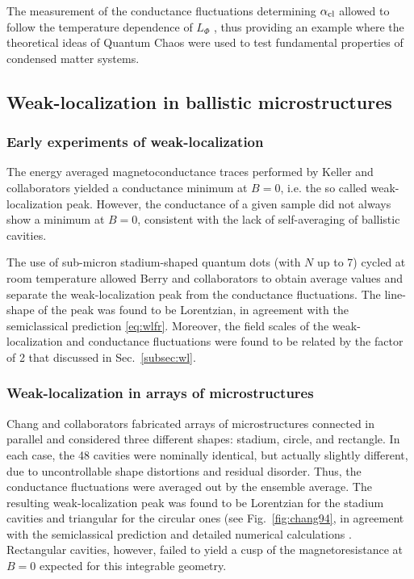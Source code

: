 \documentclass[a4paper,10pt]{article}
\newcommand{\nin}{\noindent}
\newcommand{\alc}{\alpha_{\rm cl}}
\begin{document}
\nin The measurement of the conductance fluctuations determining $\alc$ allowed to follow the temperature dependence of $L_{\Phi}$ \cite{marcusgroup3}, thus providing an example where the theoretical ideas of Quantum Chaos were used to test fundamental properties of condensed matter systems.

\subsection{Weak-localization in ballistic microstructures}
\label{subsec:wlibm}

\subsubsection{Early experiments of weak-localization}
\label{subsec:ee}

\nin The energy averaged magnetoconductance traces performed by Keller and collaborators \cite{Kel94} yielded a conductance minimum at $B=0$, i.e. the so called weak-localization peak. However, the conductance of a given sample did not always show a minimum at $B\!=\!0$, consistent with the lack of self-averaging of ballistic cavities. 

\nin The use of sub-micron stadium-shaped quantum dots (with $N$ up to 7) cycled at room temperature allowed Berry and collaborators \cite{berry94} to obtain average values and separate the weak-localization peak from the conductance fluctuations. The line-shape of the peak was found to be Lorentzian, in agreement with the semiclassical prediction \ref{eq:wlfr}. Moreover, the field scales of the weak-localization and conductance fluctuations were found to be related by the factor of 2 that discussed in
Sec.~\ref{subsec:wl}.

\subsubsection{Weak-localization in arrays of microstructures}
\label{subsec:wlam}

\nin Chang and collaborators \cite{chang94} fabricated arrays of microstructures connected in parallel and considered three different  shapes: stadium, circle, and rectangle. In each case, the 48 cavities were nominally identical, but actually slightly different, due to uncontrollable shape distortions and residual disorder. Thus, the conductance fluctuations  were averaged out by the ensemble average. The resulting weak-localization peak was found to be Lorentzian for the stadium cavities and triangular for the circular ones (see Fig.~\ref{fig:chang94}, in agreement with the semiclassical prediction and detailed numerical calculations \cite{revha}. Rectangular cavities, however, failed to yield a cusp of the  magnetoresistance at $B\!=\!0$ expected for this integrable geometry.
\end{document}
